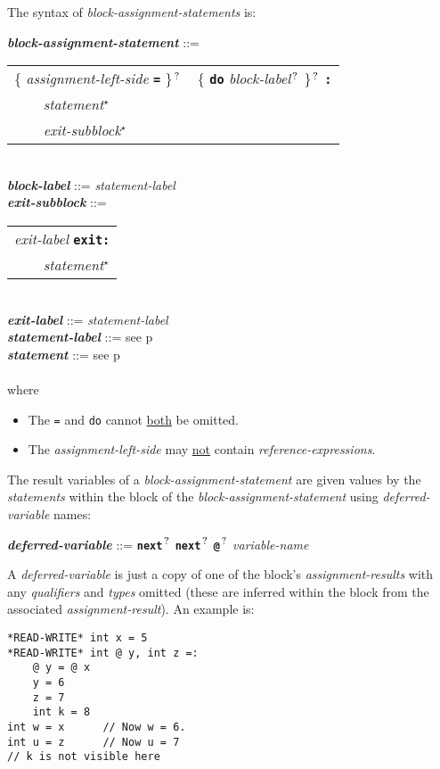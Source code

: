 \documentclass[12pt]{article}
\newcommand{\TT}[1]{{\tt \bfseries #1}}
\newcommand{\STAR}{{\Large $^\star$}}
\newcommand{\QMARK}{{$^{\,\mbox{\footnotesize ?}}$}}
\newcommand{\ttkey}[1]{{\tt \bfseries #1}}
\newcommand{\emkey}[1]{{\em \bfseries #1}}
\newcommand{\pagref}[1]{p\pageref{#1}}
\newenvironment{indpar}[1][0.3in]%
	{\begin{list}{}%
		     {\setlength{\itemsep}{0in}%
		      \setlength{\topsep}{0in}%
		      \setlength{\parsep}{1ex}%
		      \setlength{\labelwidth}{#1}%
		      \setlength{\leftmargin}{#1}%
		      \addtolength{\leftmargin}{\labelsep}}%
	 \item}%
	{\end{list}}
\begin{document}
The syntax of {\em block-assignment-statements} is:

\begin{indpar}
\emkey{block-assignment-statement} ::= \\
\hspace*{0.5in}\begin{tabular}[t]{l}
        \{ {\em assignment-left-side} \TT{=} \}\QMARK{}
	~ \{ \ttkey{do} {\em block-label}\QMARK{} \}\QMARK{}
	\TT{:} \\
	\TT{~~~~}{\em statement}\STAR{} \\
	\TT{~~~~}{\em exit-subblock}\STAR{}
	\end{tabular} \\
\emkey{block-label} ::= {\em statement-label}
\\[0.5ex]
\emkey{exit-subblock} ::=
    \begin{tabular}[t]{l}
    {\em exit-label} \ttkey{exit}\TT{:} \\
    \TT{~~~~}{\em statement}\STAR{} \\
    \end{tabular} \\
\emkey{exit-label} ::= {\em statement-label}
\\[0.5ex]
\emkey{statement-label} ::= see \pagref{STATEMENT-LABEL} \\
\emkey{statement} ::= see \pagref{STATEMENT} \\
\\[1ex]
where
\begin{itemize}
\item The {\tt =} and {\tt do} cannot \underline{both} be omitted.
\item The {\em assignment-left-side} may \underline{not} contain
{\em reference-expressions}.
\end{itemize}
\end{indpar}

The result variables of a {\em block-assignment-statement}
are given values by the {\em statements} within the block
of the {\em block-assignment-statement} using {\em deferred-variable}
names:
\begin{indpar}
\emkey{deferred-variable}\label{DEFERRED-VARIABLE} ::=
    \TT{next}\QMARK{} \TT{next}\QMARK{} \TT{@}\QMARK{} {\em variable-name}
\end{indpar}
A {\em deferred-variable} is just a copy of one of the
block's {\em assignment-results} with any {\em qualifiers}
and {\em types} omitted (these are inferred within the block
from the associated {\em assignment-result}).  An example is:
\begin{indpar}\begin{verbatim}
*READ-WRITE* int x = 5
*READ-WRITE* int @ y, int z =:
    @ y = @ x
    y = 6
    z = 7
    int k = 8
int w = x      // Now w = 6.
int u = z      // Now u = 7
// k is not visible here
\end{verbatim}\end{indpar}
\end{document}
